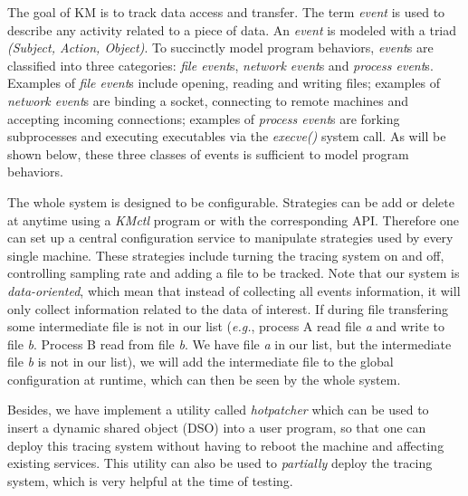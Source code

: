 \documentclass[letterpaper,twocolumn,10pt]{article}
\begin{document}
The goal of KM is to track data access and transfer. The term \textit{event}
is used to describe any activity related to a piece of data. An
\textit{event} is modeled with a triad \textit{(Subject, Action, Object)}. To
succinctly model program behaviors, \textit{event}s are classified into three
categories: \textit{file event}s, \textit{network event}s and \textit{process
event}s. Examples of \textit{file event}s include opening, reading and
writing files; examples of \textit{network event}s are binding a socket,
connecting to remote machines and accepting incoming connections; examples of
\textit{process event}s are forking subprocesses and executing executables
via the \textit{execve()} system call. As will be shown below, these three
classes of events is sufficient to model program behaviors. 

The whole system is designed to be configurable. Strategies can be add or
delete at anytime using a \textit{KMctl} program or with the corresponding
API. Therefore one can set up a central configuration service to manipulate
strategies used by every single machine. These strategies include turning the
tracing system on and off, controlling sampling rate and adding a file to be
tracked. Note that our system is \textit{data-oriented}, which mean that
instead of collecting all events information, it will only collect
information related to the data of interest. If during file transfering some
intermediate file is not in our list (\textit{e.g.}, process A read file
\textit{a} and write to file \textit{b}. Process B read from file \textit{b}.
We have file \textit{a} in our list, but the intermediate file \textit{b} is
not in our list), we will add the intermediate file to the global
configuration at runtime, which can then be seen by the whole system. 

Besides, we have implement a utility called \textit{hotpatcher} which can be
used to insert a dynamic shared object (DSO) into a user program, so that one
can deploy this tracing system without having to reboot the machine and
affecting existing services. This utility can also be used to
\textit{partially} deploy the tracing system, which is very helpful at the
time of testing.\\
\end{document}
